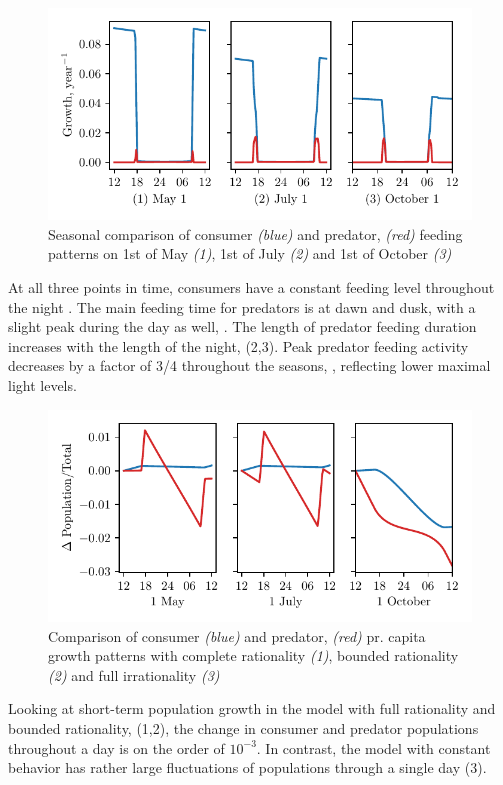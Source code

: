 \begin{figure}[H]
\includegraphics{plots/growth_short_rational.pdf}
\caption{Seasonal comparison of consumer \emph{(blue)} and predator, \emph{(red)} feeding patterns on 1st of May \emph{(1)}, 1st of July \emph{(2)} and 1st of October \emph{(3)}}
\label{fig:growth_short_rational}

\end{figure}
At all three points in time, consumers have a constant feeding level throughout the night . The main feeding time for predators is at dawn and dusk, with a slight peak during the day as well, . The length of predator feeding duration increases with the length of the night,  (2,3). Peak predator feeding activity decreases by a factor of 3/4 throughout the seasons, , reflecting lower maximal light levels.
\begin{figure}[H]
  \begin{centering}
\includegraphics{plots/pop_dyn_comp_full_semi_none.pdf}
\end{centering}
\caption{Comparison of consumer \emph{(blue)} and predator, \emph{(red)} pr. capita growth patterns with complete rationality \emph{(1)}, bounded rationality \emph{(2)} and full irrationality \emph{(3)}}
\label{fig:pop_short_term}
\end{figure}
Looking at short-term population growth in the model with full rationality and bounded rationality, (1,2), the change in consumer and predator populations throughout a day is on the order of $10^{-3}$. In contrast, the model with constant behavior has rather large fluctuations of populations through a single day (3).


